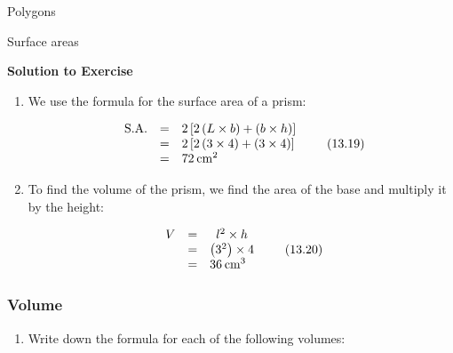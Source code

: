 \begin{exercises}{Polygons}
\begin{exercises}{Surface areas }
{\begin{mdframed}[linewidth=4, leftmargin=40, rightmargin=40]
\begin{exercise}
\label{m39357*eip-51}\noindent\textbf{Solution to Exercise }
  \label{m39357*eip-226}\begin{enumerate}[noitemsep, label=\textbf{Step} \textbf{\arabic*}. ] 
            \leftskip=20pt\rightskip=\leftskip\item We use the formula for the surface area of a prism:
      \label{m39357*id1166229703568}\nopagebreak\noindent{}
        
    \begin{equation}
    \begin{array}{ccc}\hfill \mathrm{S.A.}& =& 2\left[2\left(L\ensuremath{\times}b\right)+\left(b\ensuremath{\times}h\right)\right]\hfill \\ & =& 2\left[2\left(3\ensuremath{\times}4\right)+\left(3\ensuremath{\times}4\right)\right]\hfill \\ & =& {72\phantom{\rule{2pt}{0ex}}\mathrm{cm}}^{2}\hfill \end{array}\tag{13.19}
      \end{equation}
    
      \item To find the volume of the prism, we find the area of the base and multiply it by the height:
      \label{m39357*id1166232868439}\nopagebreak\noindent{}
        
    \begin{equation}
    \begin{array}{ccc}V\hfill & =& {l}^{2}\ensuremath{\times}h\\ & =& \left({3}^{2}\right)\ensuremath{\times}4\hfill \\ & =& {36\phantom{\rule{2pt}{0ex}}\mathrm{cm}}^{3}\hfill \end{array}\tag{13.20}
      \end{equation}
    
      \end{enumerate}
        


    \end{exercise}
    \end{mdframed}
    }
    \noindent
  \label{m39357*secfhsst!!!underscore!!!id132}
            \subsubsection{  Volume }
            \nopagebreak
            
        \label{m39357*id63019}\begin{enumerate}[noitemsep, label=\textbf{\arabic*}. ] 
            \label{m39357*uid17}\item Write down the formula for each of the following volumes:


\end{enumerate}
\end{exercises}
\end{exercises}

